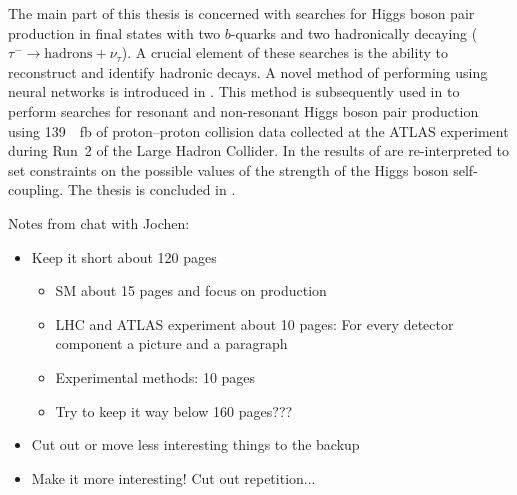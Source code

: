 The main part of this thesis is concerned with searches for Higgs boson pair
production in final states with two $b$-quarks and two hadronically decaying
\tauleptons ($\tau^{-} \to \text{hadrons} + \nu_\tau$). A crucial element of
these searches is the ability to reconstruct and identify hadronic \taulepton
decays. A novel method of performing \tauid using neural networks is
introduced in . This method is subsequently used in
 to perform searches for resonant and non-resonant Higgs boson
pair production using \SI{139}{\per\femto\barn} of proton--proton collision data
collected at the ATLAS experiment during Run~2 of the Large Hadron Collider. In
 the results of  are
re-interpreted to set constraints on the possible values of the strength of the
Higgs boson self-coupling. The thesis is concluded in .

\clearpage



Notes from chat with Jochen:
\begin{itemize}

\item Keep it short \ra about 120 pages
  \begin{itemize}
  \item SM about 15 pages and focus on \HH production

  \item LHC and ATLAS experiment about 10 pages: For every detector
    component a picture and a paragraph

  \item Experimental methods: 10 pages

  \item Try to keep it way below 160 pages???
  \end{itemize}

\item Cut out or move less interesting things to the backup

\item Make it more interesting! Cut out repetition...

\end{itemize}




